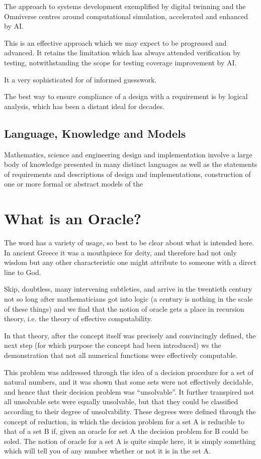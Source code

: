 \documentclass[10pt,titlepage]{book}
\begin{document}
The approach to systems development exemplified by digital twinning and the Omniverse centres around computational simulation, accelerated and enhanced by AI.

This is an effective approach which we may expect to be progressed and advanced.
It retains the limitation which has always attended verification by testing, notwithstanding the scope for testing coverage improvement by AI.

It a very sophisticated for of informed guesswork.

The best way to ensure compliance of a design with a requirement is by logical analysis, which has been a distant ideal for decades.

\subsection{Language, Knowledge and Models}

Mathematics, science and engineering design and implementation involve a large body of knowledge presented in many distinct languages as well as the statements of requirements and descriptions of design and implementations, construction of one or more formal or abstract models of the

\section{What is an Oracle?}

The word has a variety of usage, so best to be clear about what is intended here.
In ancient Greece it was a mouthpiece for deity, and therefore had not only wisdom but any other characteristic one might attribute to someone with a direct line to God.

Skip, doubtless, many intervening subtleties, and arrive in the twentieth century not so long after mathematicians got into logic (a century is nothing in the scale of these things) and we find that the notion of oracle gets a place in recursion theory, i.e. the theory of effective computability.

In that theory, after the concept itself was precisely and convincingly defined, the next step (for which purpose the concept had been introduced) ws the demonstration that not all numerical functions were effectively computable.

This problem was addressed through the idea of a decision procedure for a set of natural numbers, and it was shown that some sets were not effectively decidable, and hence that their decision problem was ``unsolvable''.
It further transpired not all unsolvable sets were equally unsolvable, but that they could be classified according to their degree of unsolvability.
These degrees were defined through the concept of reduction, in which the decision problem for a set A is reducible to that of a set B if, given an oracle for set A the decision problem for B could be soled.
The notion of oracle for a set A is quite simple here, it is simply something which will tell you of any number whether or not it is in the set A.
\end{document}
